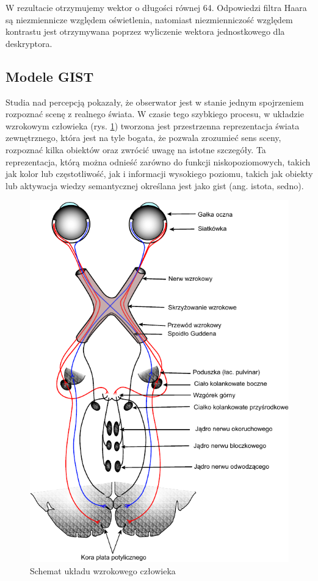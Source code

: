 W rezultacie otrzymujemy wektor o długości równej 64. Odpowiedzi filtra Haara są niezmiennicze względem oświetlenia, natomiast niezmienniczość względem kontrastu jest otrzymywana poprzez wyliczenie wektora jednostkowego dla deskryptora.

\subsection{Modele GIST}

Studia nad percepcją pokazały, że obserwator jest w stanie jednym spojrzeniem rozpoznać scenę z realnego świata. W czasie tego szybkiego procesu, w układzie wzrokowym człowieka (rys. \ref{fig:gist-vision-system}) tworzona jest przestrzenna reprezentacja świata zewnętrznego, która jest na tyle bogata, że pozwala zrozumieć sens sceny, rozpoznać kilka obiektów oraz zwrócić uwagę na istotne szczegóły. Ta reprezentacja, którą można odnieść zarówno do funkcji niskopoziomowych, takich jak kolor lub częstotliwość, jak i informacji wysokiego poziomu, takich jak obiekty lub aktywacja wiedzy semantycznej określana jest jako gist (ang. istota, sedno).

\begin{figure}[h]
	\centering
	\includegraphics[scale=1.0]{graphics/01_podstawy_teoretyczne/gist-vision-system.pdf}
	\caption{Schemat układu wzrokowego człowieka \cite{GRAY18}}
	\label{fig:gist-vision-system}
\end{figure}

